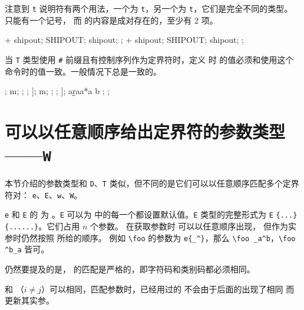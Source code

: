 \documentclass[openany]{book}
\begin{document}
注意到 \texttt t 说明符有两个用法，一个为 \verb|t|，另一个为 
\verb|t|，它们是完全不同的类型。 只能有一个记号，
而  的内容是成对存在的，至少有 2 项。

\begin{examcode}{}
\DeclareEKeysCommand {} {\detokenize{[#1|#2]}}
\DeclareEKeysCommand {}
\ttfamily\obeylines
\def\ipout{ipout}
\faa + shipout; \faa * SHIPOUT; \faa sh\ipout; \faa ;
\fbb + shipout; \fbb * SHIPOUT; \fbb sh\ipout; \fbb ;
\end{examcode}

当 \texttt T 类型使用 \texttt\# 前缀且有控制序列作为定界符时，定义  时 
 的值必须和使用这个  命令时的值一致。一般情况下总是一致的。

\begin{examcode}{}
\DeclareEKeysCommand {} {}
\DeclareEKeysCommand {} {}
\DeclareEKeysCommand {} {}
\ttfamily\obeylines
\faa [{bracket[b]}]; \faa * m; ; \faa ;
\fbb [bracket[b]];   \fbb * m; ; \fbb ;
\fcc [bracket[b]];   \fcc \a a\a r\b\b \fcc *aa*a b ; \fcc ;
\end{examcode}

\section{可以以任意顺序给出定界符的参数类型——\texttt W}

本节介绍的参数类型和 \texttt D、\texttt T 类似，但不同的是它们可以以任意顺序匹配多个定界符对：
\texttt e、\texttt E、\texttt w、\texttt W。

\texttt e 和 \texttt E 的  为 。\texttt E 
可以为  中的每一个都设置默认值。\texttt E 类型的完整形式为 
\verb|E| \texttt{\{...\}
  \{......\}}。它们占用 $n$ 个参数。
在获取参数时  可以以任意顺序出现，
但作为实参时仍然按照  所给的顺序。
例如 \verb|\foo| 的参数为 \verb|e{_^}|，那么 \verb|\foo _a^b|，\verb|\foo ^b_a| 皆可。

仍然要提及的是， 的匹配是严格的，即字符码和类别码都必须相同。

 和 （$i\ne j$）可以相同，匹配参数时，已经用过的 
不会由于后面的出现了相同  而更新其实参。
\end{document}
